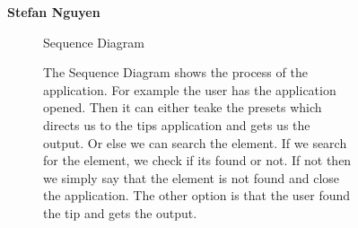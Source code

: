 \documentclass{article}
\begin{document}
	\begin{figure}[htbp]
		\textbf{Stefan Nguyen}
		\centering
		\begin{subfigure}{\textwidth}
			\resizebox{\textwidth}{!}{}
			\caption{Sequence Diagram}
		\end{subfigure}
		\begin{subfigure}{\textwidth}
			The Sequence Diagram shows the process of the application. For example the user has the application opened. Then it can
			either teake the presets which directs us to the tips application and gets us the output. Or else we can search the element. 
			If we search for the element, we check if its found or not. If not then we simply say that the element is not found and close the application. 
			The other option is that the user found the tip and gets the output. 
		\end{subfigure}
	\end{figure}
	\clearpage
\end{document}
